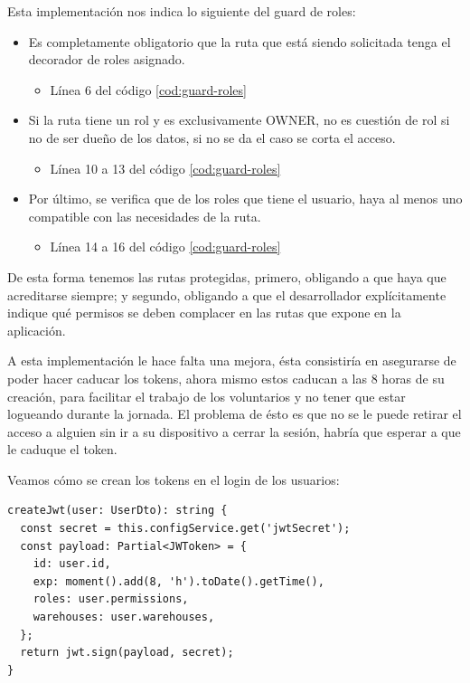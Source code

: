 \clearpage
Esta implementación nos indica lo siguiente del guard de roles:
\begin{itemize}
    \item Es completamente obligatorio que la ruta que está siendo solicitada tenga el decorador de roles asignado.
    \begin{itemize}
        \item Línea 6 del código \ref{cod:guard-roles}
    \end{itemize}
    \item Si la ruta tiene un rol y es exclusivamente OWNER, no es cuestión de rol si no de ser dueño de los datos, si no se da el caso se corta el acceso.
    \begin{itemize}
        \item Línea 10 a 13 del código \ref{cod:guard-roles}
    \end{itemize}
    \item Por último, se verifica que de los roles que tiene el usuario, haya al menos uno compatible con las necesidades de la ruta.
    \begin{itemize}
        \item Línea 14 a 16 del código \ref{cod:guard-roles}
    \end{itemize}
\end{itemize}
\vspace{1em}
\par De esta forma tenemos las rutas protegidas, primero, obligando a que haya que acreditarse siempre; y segundo, obligando a que el desarrollador explícitamente indique qué permisos se deben complacer en las rutas que expone en la aplicación.
\vspace{1em}
\par A esta implementación le hace falta una mejora, ésta consistiría en asegurarse de poder hacer caducar los tokens, ahora mismo estos caducan a las 8 horas de su creación, para facilitar el trabajo de los voluntarios y no tener que estar logueando durante la jornada. El problema de ésto es que no se le puede retirar el acceso a alguien sin ir a su dispositivo a cerrar la sesión, habría que esperar a que le caduque el token.
\vspace{1em}
\par Veamos cómo se crean los tokens en el login de los usuarios:
\vspace{1em}
\par
\begin{lstlisting}[caption={Jwt service: Creación de token},label=cod:service-jwt-create]
createJwt(user: UserDto): string {
  const secret = this.configService.get('jwtSecret');
  const payload: Partial<JWToken> = {
    id: user.id,
    exp: moment().add(8, 'h').toDate().getTime(),
    roles: user.permissions,
    warehouses: user.warehouses,
  };
  return jwt.sign(payload, secret);
}
\end{lstlisting}
\clearpage

